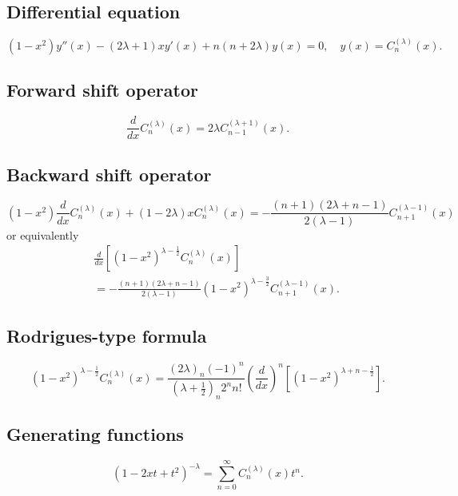 \documentclass[envcountchap,graybox]{svmono}
\begin{document}
\subsection*{Differential equation}
\begin{equation}
\label{dvGegenbauer}
(1-x^2)y''(x)-(2\lambda+1)xy'(x)+n(n+2\lambda)y(x)=0,\quad y(x)=C_n^{(\lambda)}(x).
\end{equation}

\subsection*{Forward shift operator}
\begin{equation}
\label{shift1Gegenbauer}
\frac{d}{dx}C_n^{(\lambda)}(x)=2\lambda C_{n-1}^{(\lambda+1)}(x).
\end{equation}

\subsection*{Backward shift operator}
\begin{equation}
\label{shift2GegenbauerI}
(1-x^2)\frac{d}{dx}C_n^{(\lambda)}(x)+(1-2\lambda)xC_n^{(\lambda)}(x)=
-\frac{(n+1)(2\lambda+n-1)}{2(\lambda-1)} C_{n+1}^{(\lambda-1)}(x)
\end{equation}
or equivalently
\begin{eqnarray}
\label{shift2GegenbauerII}
& &\frac{d}{dx}\left[(1-x^2)^{\lambda-\textstyle\frac{1}{2}}C_n^{(\lambda)}(x)\right]\nonumber\\
& &{}=-\frac{(n+1)(2\lambda+n-1)}{2(\lambda-1)}(1-x^2)^{\lambda-\textstyle\frac{3}{2}}C_{n+1}^{(\lambda-1)}(x).
\end{eqnarray}

\subsection*{Rodrigues-type formula}
\begin{equation}
\label{RodGegenbauer}
(1-x^2)^{\lambda-\frac{1}{2}}C_n^{(\lambda)}(x)=
\frac{(2\lambda)_n(-1)^n}{(\lambda+\frac{1}{2})_n2^nn!}\left(\frac{d}{dx}\right)^n
\left[(1-x^2)^{\lambda+n-\frac{1}{2}}\right].
\end{equation}

\subsection*{Generating functions}
\begin{equation}
\label{GenGegenbauer1}
(1-2xt+t^2)^{-\lambda}=\sum_{n=0}^{\infty}C_n^{(\lambda)}(x)t^n.
\end{equation}
\end{document}
